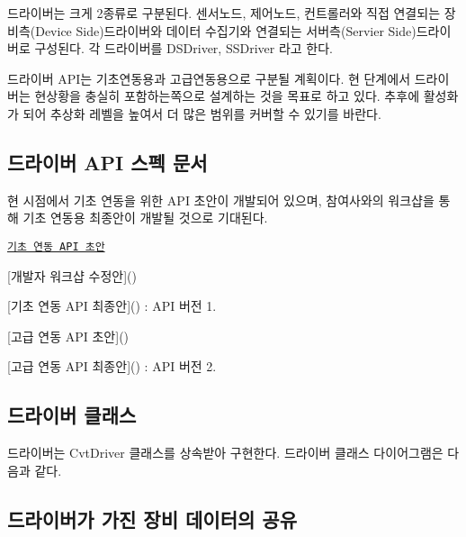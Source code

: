 드라이버는 크게 2종류로 구분된다. 센서노드, 제어노드, 컨트롤러와 직접 연결되는 장비측(\+Device Side)드라이버와 데이터 수집기와 연결되는 서버측(\+Servier Side)드라이버로 구성된다. 각 드라이버를 D\+S\+Driver, S\+S\+Driver 라고 한다.

드라이버 A\+P\+I는 기초연동용과 고급연동용으로 구분될 계획이다. 현 단계에서 드라이버는 현상황을 충실히 포함하는쪽으로 설계하는 것을 목표로 하고 있다. 추후에 활성화가 되어 추상화 레벨을 높여서 더 많은 범위를 커버할 수 있기를 바란다.

\subsection*{드라이버 A\+PI 스펙 문서}

현 시점에서 기초 연동을 위한 A\+PI 초안이 개발되어 있으며, 참여사와의 워크샵을 통해 기초 연동용 최종안이 개발될 것으로 기대된다.


\begin{DoxyEnumerate}
\item \href{https://ebio-snu.github.io/cvtdriver/}{\tt 기초 연동 A\+PI 초안}
\end{DoxyEnumerate}
\begin{DoxyEnumerate}
\item \mbox{[}개발자 워크샵 수정안\mbox{]}()
\end{DoxyEnumerate}
\begin{DoxyEnumerate}
\item \mbox{[}기초 연동 A\+PI 최종안\mbox{]}() \+: A\+PI 버전 1.
\end{DoxyEnumerate}
\begin{DoxyEnumerate}
\item \mbox{[}고급 연동 A\+PI 초안\mbox{]}()
\end{DoxyEnumerate}
\begin{DoxyEnumerate}
\item \mbox{[}고급 연동 A\+PI 최종안\mbox{]}() \+: A\+PI 버전 2.
\end{DoxyEnumerate}

\subsection*{드라이버 클래스}

드라이버는 Cvt\+Driver 클래스를 상속받아 구현한다. 드라이버 클래스 다이어그램은 다음과 같다. 

\subsection*{드라이버가 가진 장비 데이터의 공유}

